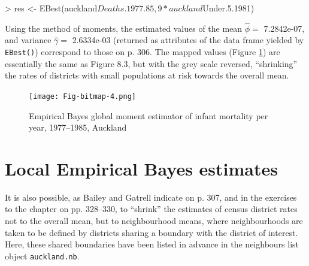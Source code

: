 \documentclass[a4paper,10pt]{article}
\newcommand{\code}[1]{\texttt{\small #1}}
\begin{document}
\begin{footnotesize}
\begin{Schunk}
\begin{Sinput}
> res <- EBest(auckland$Deaths.1977.85, 9 * auckland$Under.5.1981)
\end{Sinput}
\end{Schunk}
\end{footnotesize}
Using the method of moments, the estimated values of the mean $\hat{\phi} = $ 7.2842e-07, and variance $\hat{\gamma} = $ 2.6334e-03 (returned as attributes of the data frame yielded by \code{EBest()}) correspond to those on p. 306. The mapped values (Figure \ref{EBest}) are essentially the same as Figure 8.3, but with the grey scale reversed, ``shrinking'' the rates of districts with small populations at risk towards the overall mean. 


\begin{footnotesize}
\begin{Schunk}
\end{Schunk}
\begin{Schunk}
\end{Schunk}
\end{footnotesize}

\begin{figure}[htbp]
\begin{center} 
\texttt{[image: Fig-bitmap-4.png]}\end{center}
\caption{Empirical Bayes global moment estimator of infant mortality per year, 1977--1985, Auckland}
\label{EBest}
\end{figure}


\section{Local Empirical Bayes estimates}

It is also possible, as Bailey and Gatrell indicate on p. 307, and in the exercises to the chapter on pp. 328--330, to ``shrink'' the estimates of census district rates not to the overall mean, but to neighbourhood means, where neighbourhoods are taken to be defined by districts sharing a boundary with the district of interest. Here, these shared boundaries have been listed in advance in the neighbours list object \code{auckland.nb}.
\end{document}
